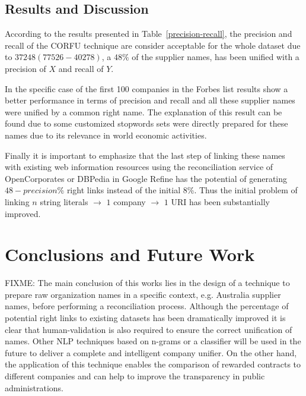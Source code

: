 \documentclass{llncs}
\begin{document}
\subsection{Results and Discussion}
According to the results presented in Table~\ref{precision-recall}, the precision 
and recall of the CORFU technique are consider acceptable for the whole dataset 
due to $37248 (77526-40278)$, a $48\%$ of the supplier names, has been unified with 
a precision of $X$ and recall of $Y$.

In the specific case of the first 100 companies in the Forbes list results show a better 
performance in terms of precision and recall and all these supplier names 
were unified by a common right name. The explanation of this result 
can be found due to some customized stopwords sets were directly prepared for 
these names due to its relevance in world economic activities.

Finally it is important to emphasize that the last step of linking these names 
with existing web information resources using the reconciliation service of 
OpenCorporates or DBPedia in Google Refine has the potential of generating $48-precision$\% right 
links instead of the initial $8$\%. Thus the initial problem of linking $n$ string literals $\to$ 
$1$ company $\to$ $1$ URI has been substantially improved. 


\section{Conclusions and Future Work}
FIXME: The main conclusion of this works lies in the design of a technique to prepare 
raw organization names in a specific context, e.g. Australia supplier names,  
before performing a reconciliation process. Although the percentage of potential 
right links to existing datasets has been dramatically improved it is clear that 
human-validation is also required to ensure the correct unification of names. 
Other NLP techniques based on n-grams or a classifier will be used in the future 
to deliver a complete and intelligent company unifier. On the other hand, the 
application of this technique enables the comparison of rewarded contracts to 
different companies and can help to improve the transparency in public 
administrations.



\end{document}
